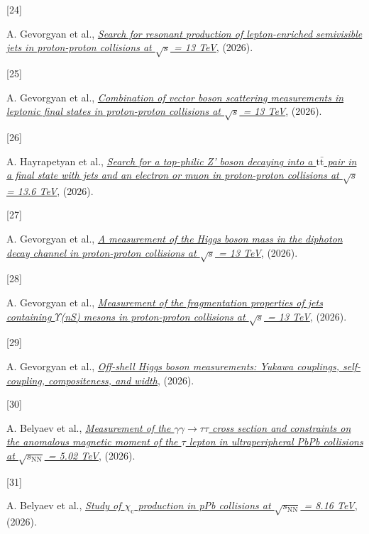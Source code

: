 \documentclass[
]{article}
\newlength{\cslhangindent}
\newlength{\csllabelwidth}
\newenvironment{CSLReferences}[2] %
 {\begin{list}{}{%
  \setlength{\itemindent}{0pt}
  \setlength{\leftmargin}{0pt}
  \setlength{\parsep}{0pt}
  \ifodd #1
   \setlength{\leftmargin}{\cslhangindent}
   \setlength{\itemindent}{-1\cslhangindent}
  \fi
  \setlength{\itemsep}{#2\baselineskip}}}
 {\end{list}}
\newcommand{\CSLLeftMargin}[1]{\parbox[t]{\csllabelwidth}{\strut#1\strut}}
\newcommand{\CSLRightInline}[1]{\parbox[t]{\linewidth - \csllabelwidth}{\strut#1\strut}}
\let\oldUpsilon\Upsilon
\renewcommand{\Upsilon}{\ensuremath{\oldUpsilon}}
\begin{document}
\begin{CSLReferences}{0}{0}
\CSLLeftMargin{{[}24{]} }%
\CSLRightInline{A. Gevorgyan et al.,
\emph{\href{https://arxiv.org/abs/2608.05323}{{Search for resonant
production of lepton-enriched semivisible jets in proton-proton
collisions at \(\sqrt{s}\) = 13 TeV}}}, (2026).}

\CSLLeftMargin{{[}25{]} }%
\CSLRightInline{A. Gevorgyan et al.,
\emph{\href{https://arxiv.org/abs/2608.01289}{{Combination of vector
boson scattering measurements in leptonic final states in proton-proton
collisions at \(\sqrt{s}\) = 13 TeV}}}, (2026).}

\CSLLeftMargin{{[}26{]} }%
\CSLRightInline{A. Hayrapetyan et al.,
\emph{\href{https://arxiv.org/abs/2608.01251}{{Search for a top-philic
Z' boson decaying into a \(\mathrm{t\bar{t}}\) pair in a final state
with jets and an electron or muon in proton-proton collisions at
\(\sqrt{s}\) = 13.6 TeV}}}, (2026).}

\CSLLeftMargin{{[}27{]} }%
\CSLRightInline{A. Gevorgyan et al.,
\emph{\href{https://arxiv.org/abs/2607.28396}{{A measurement of the
Higgs boson mass in the diphoton decay channel in proton-proton
collisions at \(\sqrt{s}\) = 13 TeV}}}, (2026).}

\CSLLeftMargin{{[}28{]} }%
\CSLRightInline{A. Gevorgyan et al.,
\emph{\href{https://arxiv.org/abs/2607.25653}{{Measurement of the
fragmentation properties of jets containing \(\ensuremath{\Upsilon}\)(nS) mesons in
proton-proton collisions at \(\sqrt{s}\) = 13 TeV}}}, (2026).}

\CSLLeftMargin{{[}29{]} }%
\CSLRightInline{A. Gevorgyan et al.,
\emph{\href{https://arxiv.org/abs/2607.23352}{{Off-shell Higgs boson
measurements: Yukawa couplings, self-coupling, compositeness, and
width}}}, (2026).}

\CSLLeftMargin{{[}30{]} }%
\CSLRightInline{A. Belyaev et al.,
\emph{\href{https://arxiv.org/abs/2607.20148}{{Measurement of the
\(\ensuremath{\gamma}\ensuremath{\gamma}\to \ensuremath{\tau}\ensuremath{\tau}\) cross section and constraints on the anomalous magnetic
moment of the \(\ensuremath{\tau}\) lepton in ultraperipheral PbPb collisions at
\(\sqrt{s_\mathrm{NN}}\) = 5.02 TeV}}}, (2026).}

\CSLLeftMargin{{[}31{]} }%
\CSLRightInline{A. Belyaev et al.,
\emph{\href{https://arxiv.org/abs/2607.17847}{{Study of
\(\ensuremath{\chi}_{\mathrm{c}}\) production in pPb collisions at
\(\sqrt{s_{\mathrm{NN}}}\) = 8.16 TeV}}}, (2026).}


\end{CSLReferences}
\end{document}
